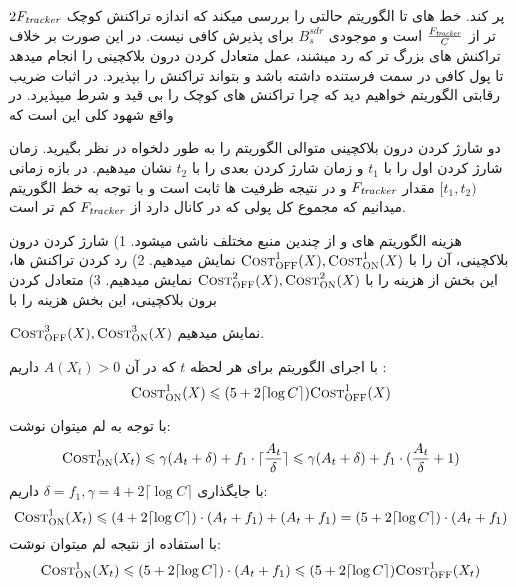 $2F_{\textit{tracker}}$
پر کند. 
خط های   تا   الگوریتم    حالتی را بررسی میکند که اندازه تراکنش کوچک تر از 
$\frac{F_{\textit{tracker}}}{C}$
است و موجودی 
$B_s^{sdr}$
برای پذیرش کافی نیست. در این صورت بر خلاف تراکنش های بزرگ تر که رد میشند، \on عمل متعادل کردن درون بلاکچینی را انجام میدهد تا پول کافی در سمت فرستنده داشته باشد و بتواند تراکنش را بپذیرد. 
در اثبات ضریب رقابتی الگوریتم خواهیم دید که چرا \on تراکنش های کوچک را بی قید و شرط میپذیرد. در واقع شهود کلی این است که 







دو شارژ کردن درون بلاکچینی متوالی الگوریتم \on را به طور دلخواه در نظر بگیرید. زمان شارژ کردن اول را با
$t_1$
و زمان شارژ کردن بعدی را با 
$t_2$
نشان میدهیم. در بازه زمانی 
$[t_1,t_2)$
مقدار 
$F_{\textit{tracker}}$
و در نتیجه ظرفیت \bucket ها ثابت است و با توجه به خط  الگوریتم   میدانیم که مجموع کل پولی که \off در کانال دارد از 
$F_{\textit{tracker}}$
کم تر است. 

هزینه الگوریتم های \on و \off از چندین منبع مختلف ناشی میشود. 1) شارژ کردن درون بلاکچینی، آن را با
$\textsc{Cost}_{\textsc{OFF}}^1(X) , \textsc{Cost}_{\textsc{ON}}^1(X)$
نمایش میدهیم.
2) رد کردن تراکنش ها، این بخش از هزینه را با 
$\textsc{Cost}_{\textsc{OFF}}^2(X) , \textsc{Cost}_{\textsc{ON}}^2(X)$
نمایش میدهیم.   3) متعادل کردن برون بلاکچینی، این بخش هزینه را با

$\textsc{Cost}_{\textsc{OFF}}^3(X) , \textsc{Cost}_{\textsc{ON}}^3(X)$
نمایش میدهیم.

با اجرای الگوریتم  برای هر لحظه
$t$
که در آن 
$A(X_t) > 0$
داریم :
\begin{equation}
\textsc{Cost}_{\textsc{ON}}^1(X) \leqslant (5+2\lceil \log{C}\rceil)\textsc{Cost}_{\textsc{OFF}}^1(X)
\end{equation}

با توجه به لم   میتوان نوشت:
\begin{equation}
\textsc{Cost}_{\textsc{ON}}^1(X_t)  \leqslant \gamma(A_t + \delta) + f_1 \cdot \lceil \frac{A_t}{\delta} \rceil   \leqslant    \gamma(A_t + \delta) + f_1 \cdot ( \frac{A_t}{\delta} +1 )
\end{equation}
با جایگذاری 
$\delta = f_1 , \gamma = 4+2\lceil \log{C}\rceil$
داریم:
\begin{equation}
\textsc{Cost}_{\textsc{ON}}^1(X_t)  \leqslant  (4+2\lceil \log{C}\rceil)\cdot(A_t + f_1) +  ( A_t + f_1 ) = (5+2\lceil \log{C}\rceil)\cdot(A_t + f_1)
\end{equation}
با استفاده از نتیجه لم  میتوان نوشت:
\begin{equation}
\textsc{Cost}_{\textsc{ON}}^1(X_t) \leqslant (5+2\lceil \log{C}\rceil)\cdot(A_t + f_1) \leqslant (5+2\lceil \log{C}\rceil)\textsc{Cost}_{\textsc{OFF}}^1(X_t)
\end{equation}

